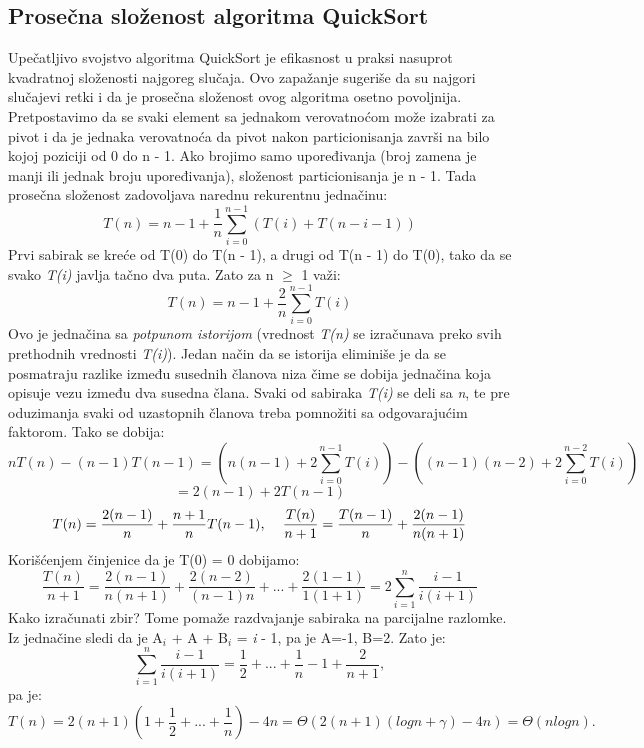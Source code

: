 \documentclass{article}
\begin{document}
\subsection{Prosečna složenost algoritma QuickSort}
Upečatljivo svojstvo algoritma QuickSort je efikasnost u praksi nasuprot kvadratnoj složenosti najgoreg slučaja. Ovo zapažanje sugeriše da su najgori slučajevi
retki i da je prosečna složenost ovog algoritma osetno povoljnija.
\newline Pretpostavimo da se svaki element sa jednakom verovatnoćom može izabrati za
pivot i da je jednaka verovatnoća da pivot nakon particionisanja završi na bilo kojoj poziciji od 0 do n - 1. Ako brojimo samo upoređivanja (broj zamena je
manji ili jednak broju upoređivanja), složenost particionisanja je n - 1. Tada
prosečna složenost zadovoljava narednu rekurentnu jednačinu:
\newline $$T(n) = n - 1 + \frac{1}{n}\sum_{i=0}^{n-1} (T(i) + T(n-i-1))$$
Prvi sabirak se kreće od T(0) do T(n - 1), a drugi od T(n - 1) do T(0), tako da
se svako \textit{T(i)} javlja tačno dva puta. Zato za n $\geq$ 1 važi:
$$T(n) = n - 1 + \frac{2}{n}\sum_{i=0}^{n-1} T(i)$$
Ovo je jednačina sa \textit{potpunom istorijom} (vrednost \textit{T(n)} se izračunava preko svih prethodnih vrednosti \textit{T(i)}). Jedan način da se istorija eliminiše je da se posmatraju razlike između susednih članova niza čime se dobija jednačina
koja opisuje vezu između dva susedna člana. Svaki od sabiraka
\textit{T(i)} se deli sa \textit{n}, te pre oduzimanja svaki od uzastopnih članova treba pomnožiti
sa odgovarajućim faktorom. Tako se dobija:
$$nT(n) - (n-1)T(n-1) = (n(n-1) + 2\sum_{i=0}^{n-1}T(i) ) - ((n-1)(n-2) + 2\sum_{i=0}^{n-2}T(i) )$$
$$ = 2(n-1) + 2T(n-1)$$
$$T(n) = \frac{2(n-1)}{n} + \frac{n+1}{n}T(n-1), \hspace*{0.4cm} 
\frac{T(n)}{n+1} = \frac{T(n-1)}{n} + \frac{2(n-1)}{n(n+1)} $$
Korišćenjem činjenice da je T(0) = 0 dobijamo:
$$ \frac{T(n)}{n+1} = \frac{2(n-1)}{n(n+1)} + \frac{2(n-2)}{(n-1)n} +...+
\frac{2(1-1)}{1(1+1)} = 2\sum_{i=1}^n \frac{i-1}{i(i+1)}$$
Kako izračunati zbir? Tome pomaže razdvajanje sabiraka na parcijalne razlomke. Iz jednačine sledi da je A$_i$ + A + B$_i$ = \textit{i} - 1, pa je A=-1, B=2. Zato je:
$$ \sum_{i=1}^n \frac{i-1}{i(i+1)} = \frac{1}{2} +...+ \frac{1}{n} - 1 + \frac{2}{n+1}, $$
pa je:
$$ T(n) = 2(n+1)(1+\frac{1}{2}+...+\frac{1}{n}) - 4n = \Theta(2(n+1)(log\textit{n}+\gamma)-4n) = \Theta(nlogn). $$
\end{document}

